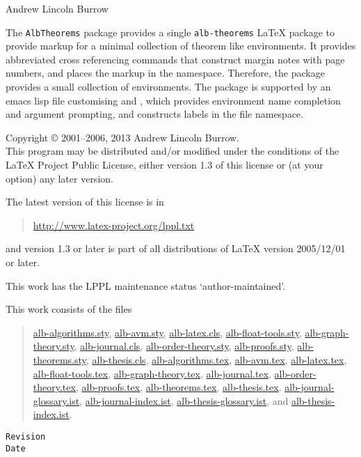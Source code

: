 \documentclass[11pt,a4paper,oneside,titlepage]{alb-latex}
\begin{document}


\begin{albTitlePage}


  Andrew Lincoln Burrow


  The \texttt{AlbTheorems} package provides a single
  \texttt{alb-theorems} \LaTeX{} package to provide markup for a minimal
  collection of theorem like environments.  It provides abbreviated
  cross referencing commands that construct margin notes with page
  numbers, and places the markup in the \albLogo{} namespace.
  Therefore, the package provides a small collection of environments.
  The package is supported by an emacs lisp file customising \AUCTeX{}
  and \RefTeX{}, which provides environment name completion and argument
  prompting, and constructs labels in the file namespace.



  Copyright \copyright{} 2001--2006, 2013 Andrew Lincoln Burrow.\\
  This program may be distributed and/or modified under the conditions
  of the \LaTeX{} Project Public License, either version 1.3 of this
  license or (at your option) any later version.

  \medskip{}

  The latest version of this license is in
  \begin{quote}
    \url{http://www.latex-project.org/lppl.txt}
  \end{quote}
  and version 1.3 or later is part of all distributions of LaTeX version
  2005/12/01 or later.

  \medskip{}

  This work has the LPPL maintenance status `author-maintained'.

  \medskip{}

  This work consists of the files
  \begin{quote}
    \begin{flushleft}
      \url{alb-algorithms.sty}, \url{alb-avm.sty}, \url{alb-latex.cls},
      \url{alb-float-tools.sty}, \url{alb-graph-theory.sty},
      \url{alb-journal.cls}, \url{alb-order-theory.sty},
      \url{alb-proofs.sty}, \url{alb-theorems.sty},
      \url{alb-thesis.cls}, \url{alb-algorithms.tex}, \url{alb-avm.tex},
      \url{alb-latex.tex}, \url{alb-float-tools.tex},
      \url{alb-graph-theory.tex}, \url{alb-journal.tex},
      \url{alb-order-theory.tex}, \url{alb-proofs.tex},
      \url{alb-theorems.tex}, \url{alb-thesis.tex}.
      \url{alb-journal-glossary.ist}, \url{alb-journal-index.ist},
      \url{alb-thesis-glossary.ist}, and \url{alb-thesis-index.ist}.
    \end{flushleft}
  \end{quote}



  \verb$Revision$\\
  \verb$Date$

\end{albTitlePage}
\end{document}

